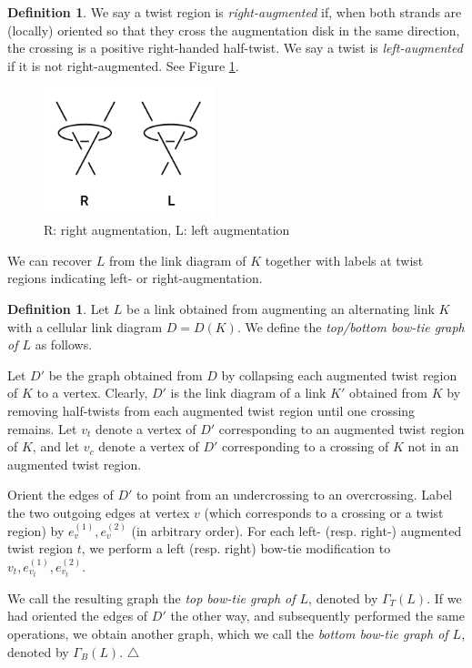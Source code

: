 \documentclass[11pt]{amsart}
\theoremstyle{plain}
\theoremstyle{definition}
\newtheorem{define}[theorem]{Definition}
\newtheorem{definition}[theorem]{Definition}
\begin{document}
\begin{define}
We say a twist region is \emph{right-augmented} if, when both strands are
(locally) oriented so that they cross the augmentation disk in the same
direction, the crossing is a positive right-handed half-twist.
We say a twist is \emph{left-augmented} if it is not right-augmented.
See Figure \ref{f:right_left_aug}.
\end{define}

\begin{figure}
\includegraphics[width=5cm]{more_pictures/right_left_aug.png}
\caption{R: right augmentation, L: left augmentation}
\label{f:right_left_aug}
\end{figure}

We can recover $L$ from the link diagram of $K$
together with labels at twist regions indicating left- or right-augmentation.

\begin{definition}
\label{d:tori-decomp-graph}
Let $L$ be a link obtained from augmenting an alternating link $K$
with a cellular link diagram $D = D(K)$.
We define the \emph{top/bottom bow-tie graph of $L$} as follows.


Let $D'$ be the graph obtained from $D$
by collapsing each augmented twist region of $K$ to a vertex.
Clearly, $D'$ is the link diagram of a link $K'$
obtained from $K$ by removing half-twists from each augmented twist region
until one crossing remains.
Let $v_t$ denote a vertex of $D'$ corresponding to
an augmented twist region of $K$,
and let $v_c$ denote a vertex of $D'$ corresponding to
a crossing of $K$ not in an augmented twist region.


Orient the edges of $D'$ to point from an undercrossing
to an overcrossing.
Label the two outgoing edges at vertex $v$
(which corresponds to a crossing or a twist region)
by $e_v^{(1)}, e_v^{(2)}$ (in arbitrary order).
For each left- (resp. right-) augmented twist region $t$,
we perform a left (resp. right) bow-tie modification to
$v_t, e_{v_t}^{(1)}, e_{v_t}^{(2)}$.


We call the resulting graph the \emph{top bow-tie graph of $L$},
denoted by $\Gamma_T(L)$.
If we had oriented the edges of $D'$ the other way,
and subsequently performed the same operations,
we obtain another graph,
which we call the \emph{bottom bow-tie graph of $L$},
denoted by $\Gamma_B(L)$.
\hfill $\triangle$
\end{definition}
\end{document}
